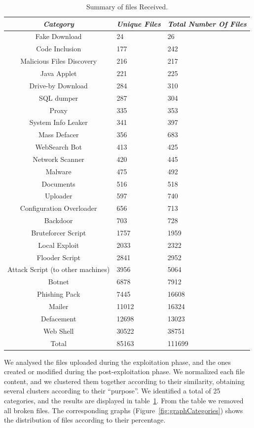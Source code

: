 \begin{table}[tbh] %
\begin{center}
\begin{tabularx}{\textwidth}{|c|X|X|}
\hline
\textit{Category} & \textit{Unique Files} & \textit{Total Number Of Files} \\
\hline
Fake Download & 24 & 26 \\
Code Inclusion & 177 & 242 \\
Malicious Files Discovery & 216 & 217 \\
Java Applet & 221 & 225 \\
Drive-by Download & 284 & 310 \\
SQL dumper & 287 & 304 \\
Proxy & 335 & 353 \\
System Info Leaker & 341 & 397 \\
Mass Defacer & 356 & 683 \\
WebSearch Bot & 413 & 425 \\
Network Scanner & 420 & 445 \\
Malware & 475 & 492 \\
Documents & 516 & 518 \\
Uploader & 597 & 740 \\
Configuration Overloader & 656 & 713 \\
Backdoor & 703 & 728 \\
Bruteforcer Script & 1757 & 1959 \\
Local Exploit & 2033 & 2322 \\
Flooder Script & 2841 & 2952 \\
Attack Script (to other machines) & 3956 & 5064 \\
Botnet & 6878 & 7912 \\
Phishing Pack & 7445 & 16608 \\
Mailer & 11012 & 16324 \\
Defacement & 12698 & 13023 \\
Web Shell & 30522 & 38751 \\
\hline \hline
Total & 85163 & 111699 \\
\hline
\end{tabularx}
\caption{Summary of files Received.\label{tab:fileCategories}}
\end{center}
\end{table}

We analysed the files uploaded during the exploitation phase, and the ones created or modified during the post-exploitation phase. We normalized each file content, and we clustered them together according to their similarity, obtaining several clusters according to their ``purpose''. We identified a total of 25 categories, and the results are displayed in table~\ref{tab:fileCategories}. From the table we removed all broken files. The corresponding graphs (Figure~\ref{fig:graphCategories}) shows the distribution of files according to their percentage.

